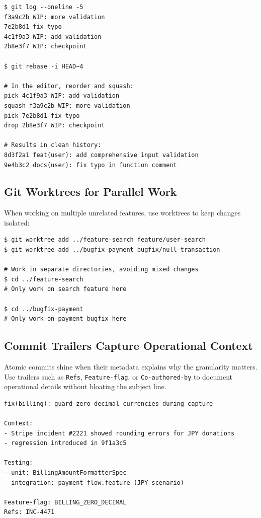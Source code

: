\begin{lstlisting}[style=shell,caption={Cleaning up commit history before pushing}]
$ git log --oneline -5
f3a9c2b WIP: more validation
7e2b8d1 fix typo
4c1f9a3 WIP: add validation
2b8e3f7 WIP: checkpoint

$ git rebase -i HEAD~4

# In the editor, reorder and squash:
pick 4c1f9a3 WIP: add validation
squash f3a9c2b WIP: more validation
pick 7e2b8d1 fix typo
drop 2b8e3f7 WIP: checkpoint

# Results in clean history:
8d3f2a1 feat(user): add comprehensive input validation
9e4b3c2 docs(user): fix typo in function comment
\end{lstlisting}

\subsection{Git Worktrees for Parallel Work}
When working on multiple unrelated features, use worktrees to keep changes isolated:

\begin{lstlisting}[style=shell,caption={Using worktrees to maintain focus}]
$ git worktree add ../feature-search feature/user-search
$ git worktree add ../bugfix-payment bugfix/null-transaction

# Work in separate directories, avoiding mixed changes
$ cd ../feature-search
# Only work on search feature here

$ cd ../bugfix-payment
# Only work on payment bugfix here
\end{lstlisting}

\subsection{Commit Trailers Capture Operational Context}
Atomic commits shine when their metadata explains why the granularity matters. Use trailers such as \texttt{Refs}, \texttt{Feature-flag}, or \texttt{Co-authored-by} to document operational details without bloating the subject line.

\begin{lstlisting}[style=markdown,caption={Commit body with structured trailers}]
fix(billing): guard zero-decimal currencies during capture

Context:
- Stripe incident #2221 showed rounding errors for JPY donations
- regression introduced in 9f1a3c5

Testing:
- unit: BillingAmountFormatterSpec
- integration: payment_flow.feature (JPY scenario)

Feature-flag: BILLING_ZERO_DECIMAL
Refs: INC-4471
\end{lstlisting}

